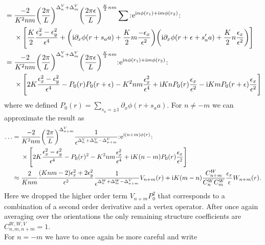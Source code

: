 \documentclass[english, parskip=full]{scrartcl}
\begin{document}
\begin{align}
&= \bsplit{&\frac{-2}{K^2nm} \kla*{\frac{2\pi}{L}}^{\Delta^V_n + \Delta^V_m} \kla*{\frac{2\pi\epsilon}{L}}^{\frac{K}{2}nm} \sum \normord{\powe{\i n\phi(r_1) + \i m\phi(r_3)}} \\
&\times \klb*{\frac{K}{2} \frac{\epsilon_x^2-\epsilon_y^2}{\epsilon^4} + \kla*{\i \partial_x\phi(r+s_aa) + \frac{K}{2} m \frac{-\epsilon_x}{\epsilon^2}} \kla*{\i \partial_x\phi(r+\epsilon + s_a'a) + \frac{K}{2} n \frac{\epsilon_x}{\epsilon^2}}} }\\
&= \bsplit{&\frac{-2}{K^2nm} \kla*{\frac{2\pi}{L}}^{\Delta^V_n + \Delta^V_m} \kla*{\frac{2\pi\epsilon}{L}}^{\frac{K}{2}nm} \normord{\powe{\i n\phi(r_1) + \i m\phi(r_3)}} \\
&\times \klb*{2K \frac{\epsilon_x^2-\epsilon_y^2}{\epsilon^4} - P_0(r)P_0(r+\epsilon) - K^2nm \frac{\epsilon_x^2}{\epsilon^4} + \i Kn P_0(r) \frac{\epsilon_x}{\epsilon^2} - \i Km P_0(r+\epsilon) \frac{\epsilon_x}{\epsilon^2} }}
\end{align}
where we defined $P_0(r) = \sum_{s_a=\pm 1} \partial_x\phi(r+s_aa)$.
For $n\neq -m$ we can approximate the result as
\begin{align}
\dots &= \bsplit{&\frac{-2}{K^2nm} \kla*{\frac{2\pi}{L}}^{\Delta^V_{n+m}} \frac{1}{\epsilon^{\Delta^V_{n} + \Delta^V_{m} - \Delta^V_{n+m}}} \normord{\powe{\i (n+m)\phi(r)}} \\
&\times \klb*{2K \frac{\epsilon_x^2-\epsilon_y^2}{\epsilon^4} - P_0(r)^2 - K^2nm \frac{\epsilon_x^2}{\epsilon^4} + \i K(n-m) P_0(r) \frac{\epsilon_x}{\epsilon^2} }}\\
&\approx \frac{2}{Knm} \frac{(K nm -2)\epsilon_x^2 + 2 \epsilon_y^2}{\epsilon^2} \frac{1}{\epsilon^{\Delta^W_{n} + \Delta^W_{m} - \Delta^V_{n+m}}} V_{n+m}(r) + \i K (m-n) \frac{C_{n+m}^W}{C_n^WC_m^W} \frac{\epsilon_x}{\epsilon} W_{n+m}(r).
\end{align}
Here we dropped the higher order term $V_{n+m}P_0^2$ that corresponds to a combination of a second order derivative and a vertex operator.
After once again averaging over the orientations the only remaining structure coefficients are $C^{W,W,V}_{n,m,n+m} = 1$.\\
For $n=-m$ we have to once again be more careful and write
\end{document}
